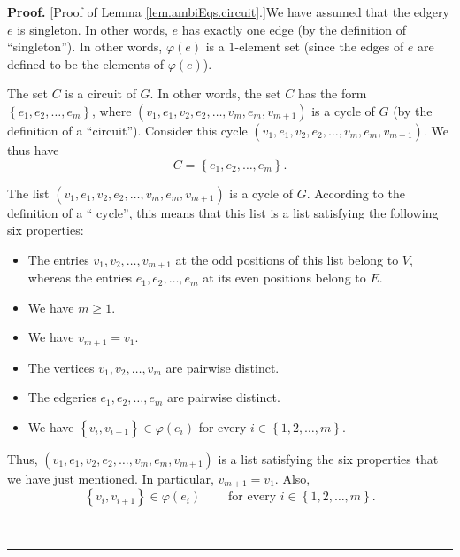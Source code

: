 \documentclass[numbers=enddot,12pt,final,onecolumn,notitlepage]{scrartcl}%
\theoremstyle{definition}
\newenvironment{proof}[1][Proof]{\noindent\textbf{#1.} }{\ \rule{0.5em}{0.5em}}
\newenvironment{verlong}{}{}
\begin{document}
\begin{verlong}
\begin{proof}
[Proof of Lemma \ref{lem.ambiEqs.circuit}.]We have assumed that the edgery $e$
is singleton. In other words, $e$ has exactly one edge (by the definition of
\textquotedblleft singleton\textquotedblright). In other words, $\varphi
\left(  e\right)  $ is a $1$-element set (since the edges of $e$ are defined
to be the elements of $\varphi\left(  e\right)  $).

The set $C$ is a circuit of $G$. In other words, the set $C$ has the form
$\left\{  e_{1},e_{2},\ldots,e_{m}\right\}  $, where $\left(  v_{1}%
,e_{1},v_{2},e_{2},\ldots,v_{m},e_{m},v_{m+1}\right)  $ is a cycle of $G$ (by
the definition of a \textquotedblleft circuit\textquotedblright). Consider
this cycle $\left(  v_{1},e_{1},v_{2},e_{2},\ldots,v_{m},e_{m},v_{m+1}\right)
$. We thus have
\begin{equation}
C=\left\{  e_{1},e_{2},\ldots,e_{m}\right\}  .
\label{pf.lem.ambiEqs.circuit.1}%
\end{equation}


The list $\left(  v_{1},e_{1},v_{2},e_{2},\ldots,v_{m},e_{m},v_{m+1}\right)  $
is a cycle of $G$. According to the definition of a \textquotedblleft
cycle\textquotedblright, this means that this list is a list satisfying the
following six properties:

\begin{itemize}
\item The entries $v_{1},v_{2},\ldots,v_{m+1}$ at the odd positions of this
list belong to $V$, whereas the entries $e_{1},e_{2},\ldots,e_{m}$ at its even
positions belong to $E$.

\item We have $m\geq1$.

\item We have $v_{m+1}=v_{1}$.

\item The vertices $v_{1},v_{2},\ldots,v_{m}$ are pairwise distinct.

\item The edgeries $e_{1},e_{2},\ldots,e_{m}$ are pairwise distinct.

\item We have $\left\{  v_{i},v_{i+1}\right\}  \in\varphi\left(  e_{i}\right)
$ for every $i\in\left\{  1,2,\ldots,m\right\}  $.
\end{itemize}

Thus, $\left(  v_{1},e_{1},v_{2},e_{2},\ldots,v_{m},e_{m},v_{m+1}\right)  $ is
a list satisfying the six properties that we have just mentioned. In
particular, $v_{m+1}=v_{1}$. Also,%
\begin{equation}
\left\{  v_{i},v_{i+1}\right\}  \in\varphi\left(  e_{i}\right)
\ \ \ \ \ \ \ \ \ \ \text{for every }i\in\left\{  1,2,\ldots,m\right\}  .
\label{pf.lem.ambiEqs.circuit.inphi}%
\end{equation}



\end{proof}
\end{verlong}
\end{document}
